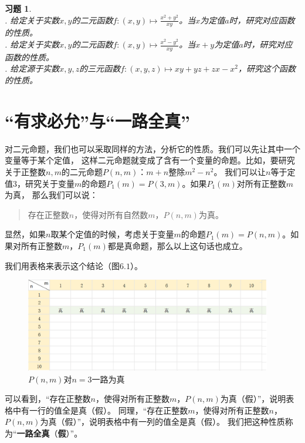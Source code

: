 \documentclass[12pt,UTF8]{ctexbook}
\newtheorem{xt}{习题}[section]
\begin{document}
\begin{xt}
    \mbox{} \\
    . 给定关于实数$x, y$的二元函数$f: (x, y) \mapsto \frac{x^2 + y^2}{xy}$。当$x$为定值$a$时，研究对应函数的性质。\\
    . 给定关于实数$x, y$的二元函数$f: (x, y) \mapsto \frac{x^2 - y^2}{xy}$。当$x+y$为定值$a$时，研究对应函数的性质。\\
    . 给定源于实数$x,y,z$的三元函数$f:(x,y,z) \mapsto xy + yz + zx - x^2$，研究这个函数的性质。
\end{xt}


\section{“有求必允”与“一路全真”}

对二元命题，我们也可以采取同样的方法，分析它的性质。我们可以先让其中一个变量等于某个定值，
这样二元命题就变成了含有一个变量的命题。比如，要研究关于正整数$n,m$的二元命题$P(n,m)$：$m + n$整除$m^2 - n^2$。
我们可以让$n$等于定值$3$，研究关于变量$m$的命题$P_1 (m) = P(3,m)$。如果$P_1(m)$对所有正整数$m$为真，
那么我们可以说：
\begin{quotation}
    存在正整数$n$，使得对所有自然数$m$，$P(n,m)$为真。
\end{quotation}
显然，如果$n$取某个定值的时候，考虑关于变量$m$的命题$P_1 (m) = P(n,m)$。如果对所有正整数$m$，$P_1(m)$都是真命题，那么以上这句话也成立。

我们用表格来表示这个结论（图$6.1$）。

\begin{figure}[h] %
    \vspace{4pt}
    \centering
    \includegraphics[width=0.96\textwidth]{多元映射10.png}
    \caption{$P(n,m)$对$n=3$一路为真}
\end{figure}

可以看到，“存在正整数$n$，使得对所有正整数$m$，$P(n,m)$为真（假）”，说明表格中有一行的值全是真（假）。
同理，“存在正整数$m$，使得对所有正整数$n$，$P(n,m)$为真（假）”，说明表格中有一列的值全是真（假）。
我们把这种性质称为“\textbf{一路全真}（\textbf{假}）”。
\end{document}

